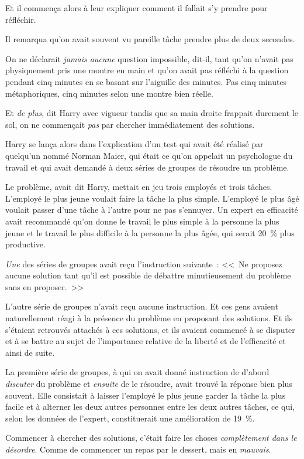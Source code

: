 Et il commença alors à leur expliquer comment il fallait s'y prendre pour réfléchir.

Il remarqua qu'on avait souvent vu pareille tâche prendre plus de deux secondes.

On ne déclarait \emph{jamais aucune} question impossible, dit-il, tant qu'on n'avait pas physiquement pris une montre en main et qu'on avait pas réfléchi à la question pendant cinq minutes en se basant sur l'aiguille des minutes. Pas cinq minutes métaphoriques, cinq minutes selon une montre bien réelle.

Et \emph{de plus}, dit Harry avec vigueur tandis que sa main droite frappait durement le sol, on ne commençait \emph{pas} par chercher immédiatement des solutions.

Harry se lança alors dans l'explication d'un test qui avait été réalisé par quelqu'un nommé Norman Maier, qui était ce qu'on appelait un psychologue du travail et qui avait demandé à deux séries de groupes de résoudre un problème.

Le problème, avait dit Harry, mettait en jeu trois employés et trois tâches. L'employé le plus jeune voulait faire la tâche la plus simple. L'employé le plus âgé voulait passer d'une tâche à l'autre pour ne pas s'ennuyer. Un expert en efficacité avait recommandé qu'on donne le travail le plus simple à la personne la plus jeune et le travail le plus difficile à la personne la plus âgée, qui serait 20~\% plus productive.

\emph{Une} des séries de groupes avait reçu l'instruction suivante~: <<~Ne proposez aucune solution tant qu'il est possible de débattre minutieusement du problème sans en proposer.~>>

L'autre série de groupes n'avait reçu aucune instruction. Et ces gens avaient naturellement réagi à la présence du problème en proposant des solutions. Et ils s'étaient retrouvés attachés à ces solutions, et ils avaient commencé à se disputer et à se battre au sujet de l'importance relative de la liberté et de l'efficacité et ainsi de suite.

La première série de groupes, à qui on avait donné instruction de d'abord \emph{discuter} du problème et \emph{ensuite} de le résoudre, avait trouvé la réponse bien plus souvent. Elle consistait à laisser l'employé le plus jeune garder la tâche la plus facile et à alterner les deux autres personnes entre les deux autres tâches, ce qui, selon les données de l'expert, constituerait une amélioration de 19~\%.

Commencer à chercher des solutions, c'était faire les choses \emph{complètement dans le désordre}. Comme de commencer un repas par le dessert, mais en \emph{mauvais}.

